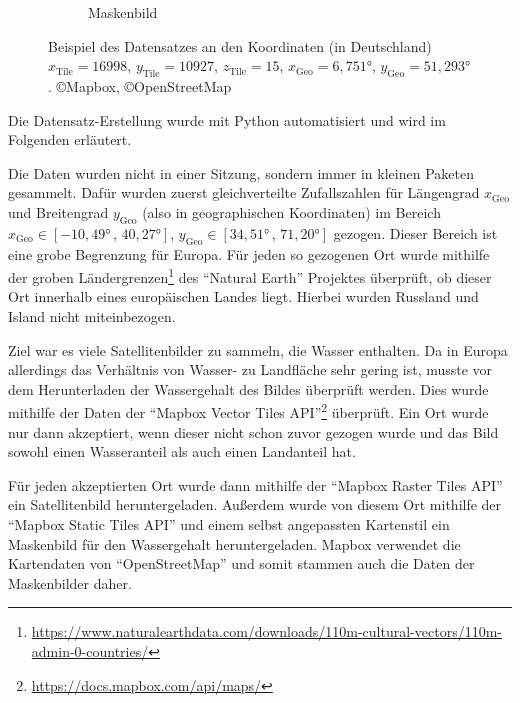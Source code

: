 \begin{figure}
\begin{subfigure}{0.3\textwidth}
        \caption{Maskenbild}
        \label{fig:datensatz_beispiel_maske.png}
    \end{subfigure}
    \caption{Beispiel des Datensatzes an den Koordinaten (in Deutschland)\\%
            ${x_\text{Tile} = 16998}$, ${y_\text{Tile} = 10927}$, ${z_\text{Tile} = 15}$, %
            ${x_\text{Geo} = 6,751°}$, ${y_\text{Geo} = 51,293°}$. %
            \copyright Mapbox, \copyright OpenStreetMap}
    \label{fig:datensatz_beispiel}
\end{figure}

Die Datensatz-Erstellung wurde mit Python automatisiert und wird im Folgenden erläutert.

Die Daten wurden nicht in einer Sitzung, sondern immer in kleinen Paketen gesammelt.
Dafür wurden zuerst gleichverteilte Zufallszahlen für Längengrad $x_\text{Geo}$ und Breitengrad $y_\text{Geo}$ (also in geographischen Koordinaten) 
im Bereich ${x_\text{Geo} \in [-10,49° \,,\, 40,27°]}$, ${y_\text{Geo} \in [34,51° \,,\, 71,20°]}$ gezogen.
Dieser Bereich ist eine grobe Begrenzung für Europa.
Für jeden so gezogenen Ort wurde mithilfe der groben Ländergrenzen\footnote{\mbox{\url{https://www.naturalearthdata.com/downloads/110m-cultural-vectors/110m-admin-0-countries/}}} des \enquote{Natural Earth} Projektes überprüft, 
ob dieser Ort innerhalb eines europäischen Landes liegt. \cite{natural_earth}
Hierbei wurden Russland und Island nicht miteinbezogen.

Ziel war es viele Satellitenbilder zu sammeln, die Wasser enthalten.
Da in Europa allerdings das Verhältnis von Wasser- zu Landfläche sehr gering ist, musste vor dem Herunterladen der Wassergehalt des Bildes überprüft werden.
Dies wurde mithilfe der Daten der \enquote{Mapbox Vector Tiles API}\footnote{\url{https://docs.mapbox.com/api/maps/}\label{mapbox_api}} überprüft. \cite{mapbox}
Ein Ort wurde nur dann akzeptiert, wenn dieser nicht schon zuvor gezogen wurde und das Bild sowohl einen Wasseranteil als auch einen Landanteil hat.

Für jeden akzeptierten Ort wurde dann mithilfe der \enquote{Mapbox Raster Tiles API} ein Satellitenbild heruntergeladen.
Außerdem wurde von diesem Ort mithilfe der \enquote{Mapbox Static Tiles API} und einem selbst angepassten Kartenstil ein Maskenbild für den Wassergehalt heruntergeladen.\cite{mapbox}
Mapbox verwendet die Kartendaten von \enquote{OpenStreetMap} und somit stammen auch die Daten der Maskenbilder daher.\cite{OpenStreetMap}

